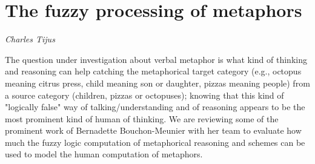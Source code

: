 \documentclass[../booklet.tex]{subfiles}
\begin{document}
\section[The fuzzy processing of metaphors. {\it Charles Tijus}]{The fuzzy processing of metaphors}

\begin{center}
  {\it Charles Tijus}
\end{center}

\vskip 0.8cm

The question under investigation about verbal metaphor is what kind of thinking and reasoning can help catching the metaphorical target category (e.g., octopus meaning citrus press,  child meaning son or daughter,  pizzas meaning people) from a source category (children, pizzas or octopuses); knowing that this kind of "logically false" way of talking/understanding and of reasoning appears to be the most prominent kind of human of thinking. We are reviewing some of the prominent work of Bernadette Bouchon-Meunier with her team to evaluate how much the fuzzy logic computation of metaphorical reasoning and schemes can be used to model the human computation of metaphors.

\end{document}
